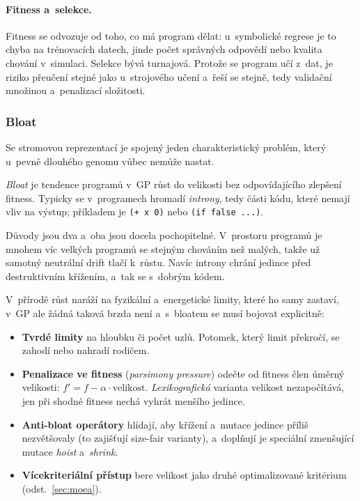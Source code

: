 \documentclass[11pt,a4paper]{article}
\theoremstyle{definition}
\begin{document}
\paragraph{Fitness a~selekce.} Fitness se odvozuje od toho, co má program dělat:
u~symbolické regrese je to chyba na trénovacích datech, jinde počet správných odpovědí
nebo kvalita chování v~simulaci. Selekce bývá turnajová. Protože se program učí z~dat,
je riziko přeučení stejné jako u~strojového učení a~řeší se stejně, tedy validační
množinou a~penalizací složitosti.

\subsubsection{Bloat}

Se stromovou reprezentací je spojený jeden charakteristický problém, který u~pevně
dlouhého genomu vůbec nemůže nastat.

\begin{defbox}[Bloat]
\emph{Bloat} je tendence programů v~GP růst do velikosti bez odpovídajícího zlepšení
fitness. Typicky se v~programech hromadí \emph{introny}, tedy části kódu, které nemají
vliv na výstup; příkladem je \texttt{(+ x 0)} nebo \texttt{(if false ...)}.
\end{defbox}

Důvody jsou dva a~oba jsou docela pochopitelné. V~prostoru programů je mnohem víc velkých
programů se stejným chováním než malých, takže už samotný neutrální drift tlačí
k~růstu. Navíc introny chrání jedince před destruktivním křížením, a~tak se
 s~dobrým kódem.

V~přírodě růst naráží na fyzikální a~energetické limity, které ho samy zastaví, v~GP
ale žádná taková brzda není a~s~bloatem se musí bojovat explicitně:
\begin{itemize}
\item \textbf{Tvrdé limity} na hloubku či počet uzlů. Potomek, který limit překročí, se
  zahodí nebo nahradí rodičem.
\item \textbf{Penalizace ve fitness} (\emph{parsimony pressure}) odečte od fitness člen
  úměrný velikosti: $f' = f - \alpha \cdot \text{velikost}$. \emph{Lexikografická}
  varianta velikost nezapočítává, jen při shodné fitness nechá vyhrát menšího jedince.
\item \textbf{Anti-bloat operátory} hlídají, aby křížení a~mutace jedince příliš
  nezvětšovaly (to zajišťují size-fair varianty), a~doplňují je speciální zmenšující
  mutace \emph{hoist} a~\emph{shrink}.
\item \textbf{Vícekriteriální přístup} bere velikost jako druhé optimalizované kritérium
  (odst.~\ref{sec:moea}).
\end{itemize}
\end{document}
